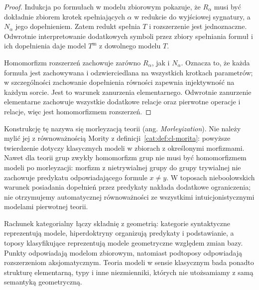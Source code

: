 \begin{proof}
Indukcja po formułach w modelu zbiorowym pokazuje, że $R_\alpha$ musi być dokładnie zbiorem krotek spełniających $\alpha$ w redukcie do wyjściowej sygnatury, a $N_\alpha$ jego dopełnieniem. Zatem redukt spełnia $T$ i rozszerzenie jest jednoznaczne. Odwrotnie interpretowanie dodatkowych symboli przez zbiory spełniania formuł i ich dopełnienia daje model $T^{\mathrm m}$ z dowolnego modelu $T$.

Homomorfizm rozszerzeń zachowuje zarówno $R_\alpha$, jak i $N_\alpha$. Oznacza to, że każda formuła jest zachowywana i odzwierciedlana na wszystkich krotkach parametrów; w szczególności zachowanie dopełnienia równości zapewnia injektywność na każdym sorcie. Jest to warunek zanurzenia elementarnego. Odwrotnie zanurzenie elementarne zachowuje wszystkie dodatkowe relacje oraz pierwotne operacje i relacje, więc jest homomorfizmem rozszerzeń.
\end{proof}

Konstrukcję tę nazywa się morleyzacją teorii (ang. \emph{Morleyization}). Nie należy mylić jej z równoważnością Mority z definicji~\ref{cat:def:cl-morita}: powyższe twierdzenie dotyczy klasycznych modeli w zbiorach z określonymi morfizmami. Nawet dla teorii grup zwykły homomorfizm grup nie musi być homomorfizmem modeli po morleyzacji: morfizm z nietrywialnej grupy do grupy trywialnej nie zachowuje predykatu odpowiadającego formule $x\neq y$. W toposach nieboolowskich warunek posiadania dopełnień przez predykaty nakłada dodatkowe ograniczenia; nie otrzymujemy automatycznej równoważności ze wszystkimi intuicjonistycznymi modelami pierwotnej teorii.

\begin{uwaga}\label{cat:rem:cl-scope}
Rachunek kategorialny łączy składnię z geometrią: kategorie syntaktyczne reprezentują modele, hiperdoktryny organizują predykaty i podstawianie, a toposy klasyfikujące reprezentują modele geometryczne względem zmian bazy. Punkty odpowiadają modelom zbiorowym, natomiast podtoposy odpowiadają rozszerzeniom aksjomatycznym. Teoria modeli w sensie klasycznym bada ponadto strukturę elementarną, typy i inne niezmienniki, których nie utożsamiamy z samą semantyką geometryczną.
\end{uwaga}
